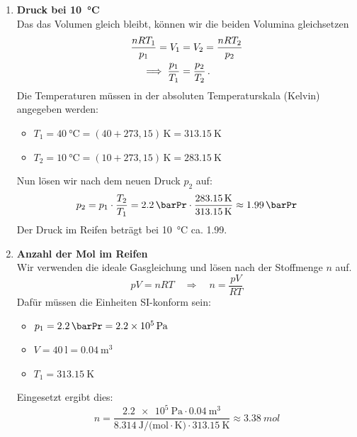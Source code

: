 \documentclass[ngerman]{scrreprt}
\newenvironment{loesungbox}[1]
  {\needspace{5\baselineskip}\begin{loesungboxstyle}[frametitle={#1}]}
  {\end{loesungboxstyle}}
\begin{document}
\begin{loesungbox}{Lösung zu \Cref{aufg:autoreifen_druck}}
\begin{enumerate}
    \item \textbf{Druck bei \SI{10}{\degreeCelsius}} \\
    Das das Volumen gleich bleibt, können wir die beiden Volumina gleichsetzen
    \begin{align}
        \frac{n R T_1}{p_1} = V_1 &= V_2 = \frac{n R T_2}{p_2} \nonumber\\
        \implies \frac{p_1}{T_1} &= \frac{p_2}{T_2} \,.
    \end{align}
    Die Temperaturen müssen in der absoluten Temperaturskala (Kelvin) angegeben werden:
    \begin{itemize}
        \item $T_1 = \SI{40}{\degreeCelsius} = (40 + 273,15)\,\si{\kelvin} = \SI{313.15}{\kelvin}$
        \item $T_2 = \SI{10}{\degreeCelsius} = (10 + 273,15)\,\si{\kelvin} = \SI{283.15}{\kelvin}$
    \end{itemize}
    Nun lösen wir nach dem neuen Druck $p_2$ auf:
    \begin{equation}\label{eq: druck_reifen_neu}
        p_2 = p_1 \cdot \frac{T_2}{T_1} = \SI{2.2}{\barPr} \cdot \frac{\SI{283.15}{\kelvin}}{\SI{313.15}{\kelvin}} \approx \SI{1.99}{\barPr}
    \end{equation}
    Der Druck im Reifen beträgt bei \SI{10}{\degreeCelsius} ca. \SI{1.99}{\barPr}.

    \item \textbf{Anzahl der Mol im Reifen} \\
    Wir verwenden die ideale Gasgleichung und lösen nach der Stoffmenge $n$ auf.
    \begin{equation}\label{eq: ideale_gasgleichung_autoreifen}
        pV = nRT \quad \Rightarrow \quad n = \frac{pV}{RT}
    \end{equation}
    Dafür müssen die Einheiten SI-konform sein:
    \begin{itemize}
        \item $p_1 = \SI{2.2}{\barPr} = \SI{2.2e5}{\pascal}$
        \item $V = \SI{40}{\litre} = \SI{0.04}{\cubic\meter}$
        \item $T_1 = \SI{313.15}{\kelvin}$
    \end{itemize}
    Eingesetzt ergibt dies:
    \begin{equation}\label{eq: mol_reifen}
        n = \frac{\SI{2.2e5}{\pascal} \cdot \SI{0.04}{\cubic\meter}}{\SI{8.314}{\joule\per(\mole\cdot\kelvin)} \cdot \SI{313.15}{\kelvin}} \approx \SI{3.38}{mol}
    \end{equation}


\end{enumerate}
\end{loesungbox}
\end{document}
